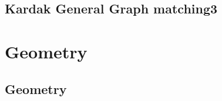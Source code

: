 \documentclass[a4paper,landscape]{article}
\begin{document}
\begin{multicols}{2}
\subsection{Kardak General Graph matching3}
	

\section{Geometry}
\subsection{Geometry}
	

\end{multicols}
\end{document}

